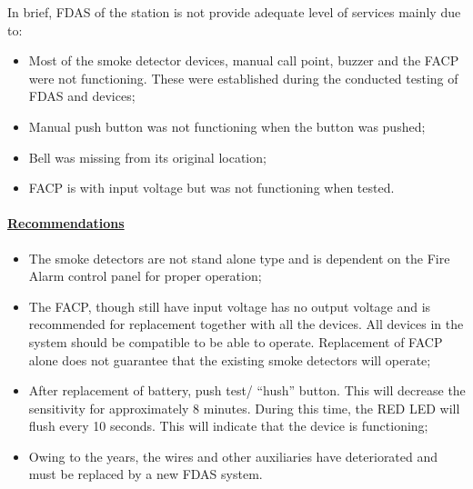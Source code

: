 In brief, FDAS of the station is not provide adequate level of services mainly due to:
\begin{itemize}
\item Most of the smoke detector devices, manual call point, buzzer and the FACP were not functioning. These were established  during the conducted testing of FDAS and devices;

\item Manual push button was not functioning when the button was pushed;

\item Bell was  missing from its original location;

\item FACP is with input voltage but was not functioning when tested.






\end{itemize}

\paragraph{\underline{Recommendations}}

\begin{itemize}
\item The smoke detectors are not stand alone type and is dependent on the Fire Alarm control panel for proper operation;

\item The FACP, though still have input voltage has no output voltage and is recommended for replacement together with all the devices. All devices in the system should be compatible to be able to operate. Replacement of FACP alone does not guarantee that the existing smoke detectors will operate;

\item After replacement of battery, push test/ “hush” button. This will decrease the sensitivity for approximately 8 minutes. During this time, the RED LED will flush every 10 seconds. This will indicate that the device is functioning;

\item Owing to the years, the wires and other auxiliaries have deteriorated and must be replaced by a new FDAS system.

\end{itemize}


